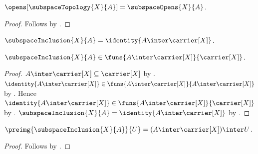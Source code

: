 \begin{proposition}\label{subspace_topology_opens}
    $\opens[\subspaceTopology{X}{A}]=\subspaceOpens{X}{A}$.
\end{proposition}
\begin{proof}
    Follows by
        .
\end{proof}

\begin{definition}\label{subspace_inclusion}
    $\subspaceInclusion{X}{A}=\identity{A\inter\carrier[X]}$.
\end{definition}

\begin{proposition}\label{subspace_inclusion_type}
    $\subspaceInclusion{X}{A}\in
        \funs{A\inter\carrier[X]}{\carrier[X]}$.
\end{proposition}
\begin{proof}
    $A\inter\carrier[X]\subseteq\carrier[X]$ by
        .
    $\identity{A\inter\carrier[X]}\in
        \funs{A\inter\carrier[X]}{A\inter\carrier[X]}$ by
        .
    Hence $\identity{A\inter\carrier[X]}\in
        \funs{A\inter\carrier[X]}{\carrier[X]}$ by
        .
    $\subspaceInclusion{X}{A}=\identity{A\inter\carrier[X]}$ by
        .
\end{proof}

\begin{proposition}\label{subspace_inclusion_preimage}
    $\preimg{\subspaceInclusion{X}{A}}{U}
        =(A\inter\carrier[X])\inter U$.
\end{proposition}
\begin{proof}
    Follows by
        .
\end{proof}


